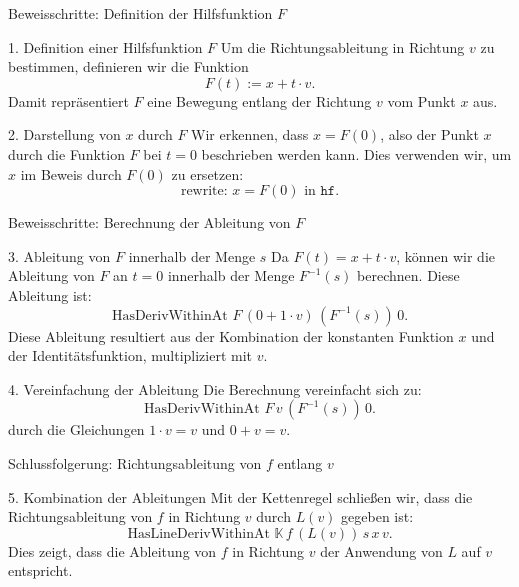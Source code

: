 \documentclass{beamer}
\begin{document}
    \begin{frame}{Beweisschritte: Definition der Hilfsfunktion \( F \)}
        \begin{block}{1. Definition einer Hilfsfunktion \( F \)}
            Um die Richtungsableitung in Richtung \( v \) zu bestimmen, definieren wir die Funktion
            \[
            F(t) := x + t \cdot v.
            \]
            Damit repräsentiert \( F \) eine Bewegung entlang der Richtung \( v \) vom Punkt \( x \) aus.
        \end{block}
    
        \begin{block}{2. Darstellung von \( x \) durch \( F \)}
            Wir erkennen, dass \( x = F(0) \), also der Punkt \( x \) durch die Funktion \( F \) bei \( t = 0 \) beschrieben werden kann. Dies verwenden wir, um \( x \) im Beweis durch \( F(0) \) zu ersetzen:
            \[
            \text{rewrite: } x = F(0) \text{ in } \texttt{hf}.
            \]
        \end{block}
    \end{frame}
    
    \begin{frame}{Beweisschritte: Berechnung der Ableitung von \( F \)}
        \begin{block}{3. Ableitung von \( F \) innerhalb der Menge \( s \)}
            Da \( F(t) = x + t \cdot v \), können wir die Ableitung von \( F \) an \( t = 0 \) innerhalb der Menge \( F^{-1}(s) \) berechnen. Diese Ableitung ist:
            \[
            \text{HasDerivWithinAt } F \, (0 + 1 \cdot v) \, (F^{-1}(s)) \, 0.
            \]
            Diese Ableitung resultiert aus der Kombination der konstanten Funktion \( x \) und der Identitätsfunktion, multipliziert mit \( v \).
        \end{block}
    
        \begin{block}{4. Vereinfachung der Ableitung}
            Die Berechnung vereinfacht sich zu:
            \[
            \text{HasDerivWithinAt } F \, v \, (F^{-1}(s)) \, 0.
            \]
            durch die Gleichungen \( 1 \cdot v = v \) und \( 0 + v = v \).
        \end{block}
    \end{frame}
    
    \begin{frame}{Schlussfolgerung: Richtungsableitung von \( f \) entlang \( v \)}
        \begin{block}{5. Kombination der Ableitungen}
            Mit der Kettenregel schließen wir, dass die Richtungsableitung von \( f \) in Richtung \( v \) durch \( L(v) \) gegeben ist:
            \[
            \text{HasLineDerivWithinAt } \mathbb{K} \, f \, (L(v)) \, s \, x \, v.
            \]
            Dies zeigt, dass die Ableitung von \( f \) in Richtung \( v \) der Anwendung von \( L \) auf \( v \) entspricht.
        \end{block}
    \end{frame}
\end{document}
